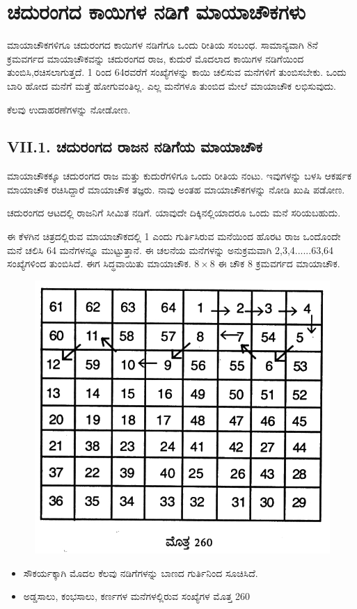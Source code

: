 \chapter{ಚದುರಂಗದ ಕಾಯಿಗಳ ನಡಿಗೆ ಮಾಯಾಚೌಕಗಳು}

ಮಾಯಾಚೌಕಗಳಿಗೂ ಚದುರಂಗದ ಕಾಯಿಗಳ ನಡಿಗೆಗೂ ಒಂದು ರೀತಿಯ ಸಂಬಂಧ. ಸಾಮಾನ್ಯವಾಗಿ 8ನೆ ಕ್ರಮವರ್ಗದ ಮಾಯಾಚೌಕವನ್ನು ಚದುರಂಗದ ರಾಜ, ಕುದುರೆ ಮೊದಲಾದ ಕಾಯಿಗಳ ನಡಿಗೆಯಿಂದ ತುಂಬಿಸಿ,ರಚಿಸಲಾಗುತ್ತದೆ. 1 ರಿಂದ 64ರವರೆಗೆ ಸಂಖ್ಯೆಗಳನ್ನು ಕಾಯಿ ಚಲಿಸುವ ಮನೆಗಳಿಗೆ ತುಂಬಿಸಬೇಕು. ಒಂದು ಬಾರಿ ಹೋದ ಮನೆಗೆ ಮತ್ತೆ ಹೋಗುವಂತಿಲ್ಲ. ಎಲ್ಲ ಮನೆಗಳೂ ತುಂಬಿದ ಮೇಲೆ ಮಾಯಾಚೌಕ ಲಭಿಸುವುದು.

ಕೆಲವು ಉದಾಹರಣೆಗಳನ್ನು ನೋಡೋಣ.

\section*{VII.1. ಚದುರಂಗದ ರಾಜನ ನಡಿಗೆಯ ಮಾಯಾಚೌಕ}

ಮಾಯಾಚೌಕಕ್ಕೂ ಚದುರಂಗದ ರಾಜ ಮತ್ತು ಕುದುರೆಗಳಿಗೂ ಒಂದು ರೀತಿಯ ನಂಟು. ಇವುಗಳನ್ನು ಬಳಸಿ ಆಕರ್ಷಕ ಮಾಯಾಚೌಕ ರಚಿಸಿದ್ದಾರೆ ಮಾಯಾಚೌಕ ತಜ್ಞರು. ನಾವು ಅಂತಹ ಮಾಯಾಚೌಕಗಳನ್ನು ನೋಡಿ ಖುಷಿ ಪಡೋಣ.

ಚದುರಂಗದ ಆಟದಲ್ಲಿ ರಾಜನಿಗೆ ಸೀಮಿತ ನಡಿಗೆ. ಯಾವುದೇ ದಿಕ್ಕಿನಲ್ಲಿಯಾದರೂ ಒಂದು ಮನೆ ಸರಿಯಬಹುದು.

ಈ ಕೆಳಗಿನ ಚಿತ್ರದಲ್ಲಿರುವ ಮಾಯಾಚೌಕದಲ್ಲಿ 1 ಎಂದು ಗುರ್ತಿಸಿರುವ ಮನೆಯಿಂದ ಹೊರಟ ರಾಜ ಒಂದೊಂದೇ ಮನೆ ಚಲಿಸಿ 64 ಮನೆಗಳನ್ನೂ ಮುಟ್ಟುತ್ತಾನೆ. ಈ ಚಲನೆಯ ಮನೆಗಳನ್ನು ಅನುಕ್ರಮವಾಗಿ 2,3,4......63,64 ಸಂಖ್ಯೆಗಳಿಂದ ತುಂಬಿಸಿದೆ. ಈಗ ಸಿದ್ಧವಾಯಿತು ಮಾಯಾಚೌಕ. $8 \times 8$ ಈ ಚೌಕ 8 ಕ್ರಮವರ್ಗದ ಮಾಯಾಚೌಕ.
\begin{figure}[H]
\includegraphics{src/figures/chap6/fig6.1.jpg}
\end{figure}
\begin{itemize}
	\item ಸೌಕರ್ಯಕ್ಕಾಗಿ ಮೊದಲ ಕೆಲವು ನಡಿಗೆಗಳನ್ನು ಬಾಣದ ಗುರ್ತಿನಿಂದ ಸೂಚಿಸಿದೆ.
	\item ಅಡ್ಡಸಾಲು, ಕಂಭಸಾಲು, ಕರ್ಣಗಳ ಮನೆಗಳಲ್ಲಿರುವ ಸಂಖ್ಯೆಗಳ ಮೊತ್ತ 260
\end{itemize}

